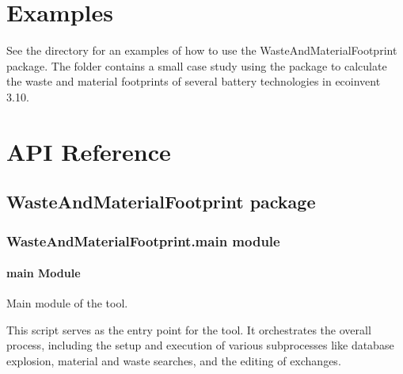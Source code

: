 \documentclass[letterpaper,10pt,english]{sphinxmanual}
\begin{document}
\sphinxstepscope


\chapter{Examples}
\label{\detokenize{examples:examples}}\label{\detokenize{examples::doc}}
\sphinxAtStartPar
See the  directory for an examples of how to use the WasteAndMaterialFootprint package.
The folder  contains a small case study using the package to calculate the waste and material footprints of several battery technologies in ecoinvent 3.10.

\sphinxstepscope


\chapter{API Reference}
\label{\detokenize{modules:api-reference}}\label{\detokenize{modules::doc}}
\sphinxstepscope


\section{WasteAndMaterialFootprint package}
\label{\detokenize{WasteAndMaterialFootprint:wasteandmaterialfootprint-package}}\label{\detokenize{WasteAndMaterialFootprint::doc}}

\subsection{WasteAndMaterialFootprint.main module}
\label{\detokenize{WasteAndMaterialFootprint:module-WasteAndMaterialFootprint.main}}\label{\detokenize{WasteAndMaterialFootprint:wasteandmaterialfootprint-main-module}}

\subsubsection{main Module}
\label{\detokenize{WasteAndMaterialFootprint:main-module}}
\sphinxAtStartPar
Main module of the  tool.

\sphinxAtStartPar
This script serves as the entry point for the  tool. It orchestrates the overall process, including the setup and execution of various subprocesses like database explosion, material and waste searches, and the editing of exchanges.
\end{document}
